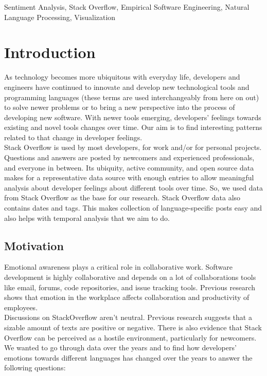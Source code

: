 \documentclass[conference]{IEEEtran}
\begin{document}
\begin{IEEEkeywords}
Sentiment Analysis, Stack Overflow, Empirical Software Engineering, Natural Language Processing, Visualization
\end{IEEEkeywords}

\section{Introduction}
As technology becomes more ubiquitous with everyday life, developers and engineers have continued to innovate and develop new technological tools and programming languages (these terms are used interchangeably from here on out) to solve newer problems or to bring a new perspective into the process of developing new software. With newer tools emerging, developers' feelings towards existing and novel tools changes over time. Our aim is to find interesting patterns related to that change in developer feelings. \\

Stack Overflow is used by most developers, for work and/or for personal projects. Questions and answers are posted by newcomers and experienced professionals, and everyone in between. Its ubiquity, active community, and open source data makes for a representative data source with enough entries to allow meaningful analysis about developer feelings about different tools over time. So, we used data from Stack Overflow as the base for our research. Stack Overflow data also contains dates and tags. This makes collection of language-specific posts easy and also helps with temporal analysis that we aim to do.

\subsection{Motivation}
Emotional awareness plays a critical role in collaborative work. Software development is highly collaborative and depends on a lot of collaborations tools like email, forums, code repositories, and issue tracking tools\cite{b1}. Previous research shows that emotion in the workplace affects collaboration and productivity of employees\cite{b2}. \\

Discussions on StackOverflow aren't neutral. Previous research suggests that a sizable amount of texts are positive or negative\cite{b3, b4, b5}. There is also evidence that Stack Overflow can be perceived as a hostile environment, particularly for newcomers\cite{b6}. We wanted to go through data over the years and to find how developers' emotions towards different languages has changed over the years to answer the following questions:
\end{document}

